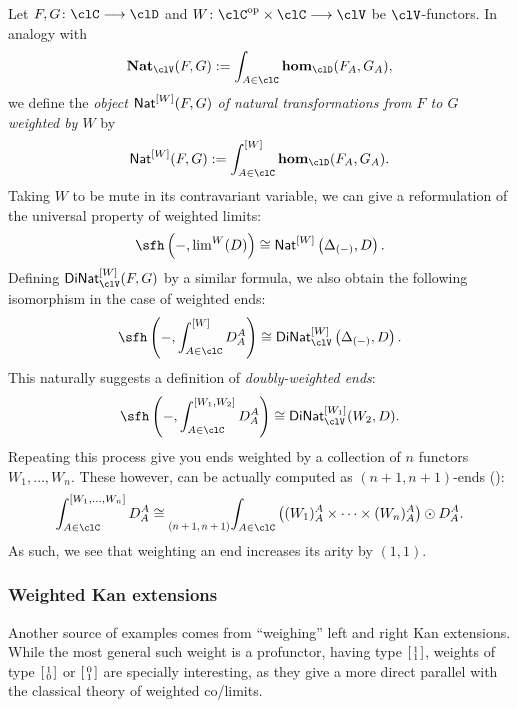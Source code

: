 \documentclass[11pt]{amsart}
\begin{document}
\begin{example}
	Let $F,G\colon\clC\longrightarrow\clD$ and $W\colon\clC^{\op}\times\clC\longrightarrow\clV$ be $\clV$-functors. In analogy with
	\[
		\VNat{\clV}(F,G)
		\defeq
		\int_{A\in\clC}\eHom_{\clD}(F_{A},G_{A}),
	\]
	we define the \emph{object $\mathsf{Nat}^{[W]}(F,G)$ of natural transformations from $F$ to $G$ weighted by $W$} by
	\begin{equation}\label{object-wnat-w-f-g-of-natural-transformations-from-f-to-g-weighted-by-w}
		\wNat{W}(F,G)
		\defeq
		\wEnd[W]{A\in\clC}\eHom_{\clD}(F_{A},G_{A}).
	\end{equation}
	Taking $W$ to be mute in its contravariant variable, we can give a reformulation of the universal property of weighted limits:
	\[
		\ph\left(-,\wlim{W}(D)\right)
		\cong
		\wNat{W}\left(\Delta_{(-)},D\right).
	\]
	Defining $\wVDiNat{W}{\clV}(F,G)$ by a similar formula, we also obtain the following isomorphism in the case of weighted ends:
	\[
		\ph\left(-,\wEnd[W]{A\in\clC}D^{A}_{A}\right)
		\cong
		\wVDiNat{W}{\clV}\left(\Delta_{(-)},D\right).
	\]
	This naturally suggests a definition of \emph{doubly-weighted ends}:
	\[
		\ph\left(-,\wEnd[W_{1},W_{2}]{A\in\clC}D^{A}_{A}\right)
		\cong
		\wVDiNat{W_{1}}{\clV}(W_{2},D).
	\]
	Repeating this process give you ends weighted by a collection of $n$ functors $W_{1},\ldots,W_{n}$. These however, can be actually computed as $(n+1,n+1)$-ends (\cite{weighend}):
	\[
		\int_{A\in\clC}^{[W_{1},\ldots,W_{n}]}D^{A}_{A}
		\cong
		\pqEnd{n+1}{n+1}{A\in\clC}\left((W_{1})^{A}_{A}\times\cdots\times(W_{n})^{A}_{A}\right)\odot D^{A}_{A}.
	\]
	As such, we see that weighting an end increases its arity by $(1,1)$.
\end{example}
\subsubsection{Weighted Kan extensions}\label{weikan}
Another source of examples comes from ``weighing'' left and right Kan extensions. While the most general such weight is a profunctor, having type $\typepq{1}{1}$, weights of type $\typepq{1}{0}$ or $\typepq{0}{1}$ are specially interesting, as they give a more direct parallel with the classical theory of weighted co/limits.
\end{document}
